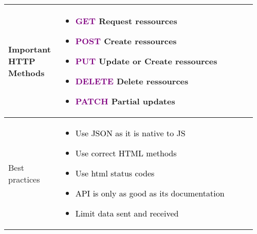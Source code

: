 \documentclass[main.tex,fontsize=8pt,paper=a4,paper=portrait,DIV=calc,]{scrartcl}
\begin{document}
\begin{table}[ht!]
\begin{tabular}{|m{0.2\linewidth}|m{0.755\linewidth}|}
\hline
Important HTTP Methods & 
\vspace{2mm}
\begin{itemize}
\item \textcolor{purple}{GET}\newline
  Request ressources
\item \textcolor{purple}{POST}\newline
  Create ressources
\item \textcolor{purple}{PUT}\newline
  Update or Create ressources
\item \textcolor{purple}{DELETE}\newline
  Delete ressources
\item \textcolor{purple}{PATCH}\newline
  Partial updates
\vspace{-3mm}
\end{itemize} \\
\hline
Best practices & 
\vspace{2mm}
\begin{itemize}
\item \textcolor{black}{Use JSON as it is native to JS}
\item \textcolor{black}{Use correct HTML methods}
\item \textcolor{black}{Use html status codes}
\item \textcolor{black}{API is only as good as its documentation}
\item \textcolor{black}{Limit data sent and received}
\vspace{-3mm}
\end{itemize}\\ 
\hline

\hline

\hline

\hline

\hline

\hline

\hline

\hline
\end{tabular}
\end{table}
\end{document}
